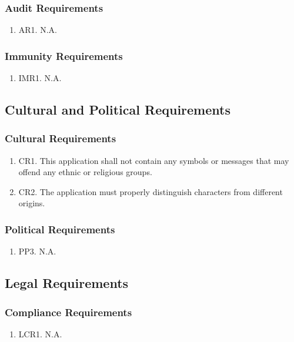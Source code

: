 \documentclass[]{article}
\begin{document}
\subsubsection{Audit Requirements}
\begin{enumerate}
	\item AR1. N.A.
\end{enumerate}

\subsubsection{Immunity Requirements}
\begin{enumerate}
	\item IMR1. N.A.
\end{enumerate}

\subsection{Cultural and Political Requirements}
\subsubsection{Cultural Requirements}
\begin{enumerate}
	\item CR1. This application shall not contain any symbols or messages that may offend any ethnic or religious groups.
	\item CR2. The application must properly distinguish characters from different origins.
\end{enumerate}

\subsubsection{Political Requirements}
\begin{enumerate}
	\item PP3. N.A.
\end{enumerate}

\subsection{Legal Requirements}
\subsubsection{Compliance Requirements}
\begin{enumerate}
	\item LCR1. N.A.
\end{enumerate}
\end{document}
